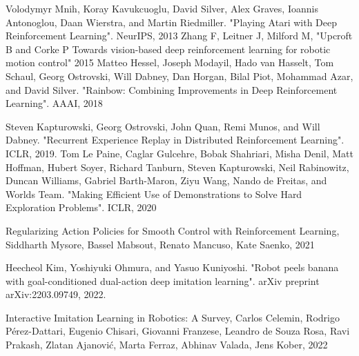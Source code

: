 \documentclass[a4j, twocolumn, 10pt,pdflatex,ja=standard]{bxjsarticle}
\begin{document}
\begin{thebibliography}{99H}
 Volodymyr Mnih, Koray Kavukcuoglu, David Silver, Alex Graves, Ioannis Antonoglou, Daan Wierstra, and Martin Riedmiller. "Playing Atari with Deep Reinforcement Learning". NeurIPS, 2013
Zhang F, Leitner J, Milford M, "Upcroft B and Corke P Towards vision-based deep reinforcement learning for robotic motion control" 2015
 Matteo Hessel, Joseph Modayil, Hado van Hasselt, Tom Schaul, Georg Ostrovski, Will Dabney, Dan Horgan, Bilal Piot, Mohammad Azar, and David Silver. "Rainbow: Combining Improvements in Deep Reinforcement Learning". AAAI, 2018

 Steven Kapturowski, Georg Ostrovski, John Quan, Remi Munos, and Will Dabney. "Recurrent Experience Replay in Distributed Reinforcement Learning". ICLR, 2019.
 Tom Le Paine, Caglar Gulcehre, Bobak Shahriari, Misha Denil, Matt Hoffman, Hubert Soyer, Richard Tanburn, Steven Kapturowski, Neil Rabinowitz, Duncan Williams, Gabriel Barth-Maron, Ziyu Wang, Nando de Freitas, and Worlds Team. "Making Efficient Use of Demonstrations to Solve Hard Exploration Problems". ICLR, 2020


 Regularizing Action Policies for Smooth Control with Reinforcement Learning, Siddharth Mysore, Bassel Mabsout, Renato Mancuso, Kate Saenko, 2021

 Heecheol Kim, Yoshiyuki Ohmura, and Yasuo Kuniyoshi. "Robot peels banana with goal-conditioned dual-action deep imitation learning". arXiv preprint arXiv:2203.09749, 2022.

Interactive Imitation Learning in Robotics: A Survey, Carlos Celemin, Rodrigo Pérez-Dattari, Eugenio Chisari, Giovanni Franzese, Leandro de Souza Rosa, Ravi Prakash, Zlatan Ajanović, Marta Ferraz, Abhinav Valada, Jens Kober, 2022

\end{thebibliography}
\end{document}

